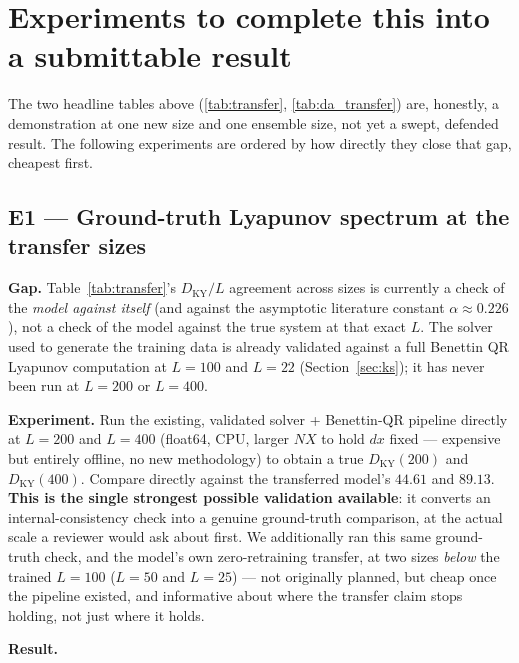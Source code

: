 \documentclass[11pt]{article}
\begin{document}
\section{Experiments to complete this into a submittable result}
\label{sec:experiments}

The two headline tables above (\ref{tab:transfer}, \ref{tab:da_transfer})
are, honestly, a demonstration at one new size and one ensemble size,
not yet a swept, defended result. The following experiments are ordered
by how directly they close that gap, cheapest first.

\subsection{E1 --- Ground-truth Lyapunov spectrum at the transfer sizes}
\label{exp:e1}

\textbf{Gap.} Table~\ref{tab:transfer}'s $D_{\mathrm{KY}}/L$ agreement
across sizes is currently a check of the \emph{model against itself}
(and against the asymptotic literature constant $\alpha\approx0.226$),
not a check of the model against the true system at that exact $L$.
The solver used to generate the training data is already validated
against a full Benettin QR Lyapunov computation at $L=100$ and $L=22$
(Section~\ref{sec:ks}); it has never been run at $L=200$ or $L=400$.

\textbf{Experiment.} Run the existing, validated solver +
Benettin-QR pipeline directly at $L=200$ and $L=400$ (float64, CPU,
larger $NX$ to hold $dx$ fixed --- expensive but entirely offline, no
new methodology) to obtain a true $D_{\mathrm{KY}}(200)$ and
$D_{\mathrm{KY}}(400)$. Compare directly against the transferred
model's $44.61$ and $89.13$. \textbf{This is the single strongest
possible validation available}: it converts an internal-consistency
check into a genuine ground-truth comparison, at the actual scale a
reviewer would ask about first. We additionally ran this same
ground-truth check, and the model's own zero-retraining transfer, at
two sizes \emph{below} the trained $L=100$ ($L=50$ and $L=25$) --- not
originally planned, but cheap once the pipeline existed, and
informative about where the transfer claim stops holding, not just
where it holds.

\textbf{Result.} \label{result:e1}
\end{document}
